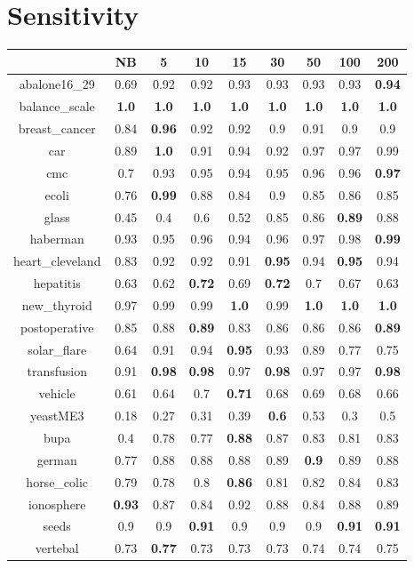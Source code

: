 \documentclass{article}%
\begin{document}
%
\section*{Sensitivity}%
\begin{tabular}{c|cccccccc}%
\hline%
&NB&5&10&15&30&50&100&200\\%
\hline%
abalone16\_29&0.69&0.92&0.92&0.93&0.93&0.93&0.93&\textbf{0.94}\\%
\hline%
balance\_scale&\textbf{1.0}&\textbf{1.0}&\textbf{1.0}&\textbf{1.0}&\textbf{1.0}&\textbf{1.0}&\textbf{1.0}&\textbf{1.0}\\%
\hline%
breast\_cancer&0.84&\textbf{0.96}&0.92&0.92&0.9&0.91&0.9&0.9\\%
\hline%
car&0.89&\textbf{1.0}&0.91&0.94&0.92&0.97&0.97&0.99\\%
\hline%
cmc&0.7&0.93&0.95&0.94&0.95&0.96&0.96&\textbf{0.97}\\%
\hline%
ecoli&0.76&\textbf{0.99}&0.88&0.84&0.9&0.85&0.86&0.85\\%
\hline%
glass&0.45&0.4&0.6&0.52&0.85&0.86&\textbf{0.89}&0.88\\%
\hline%
haberman&0.93&0.95&0.96&0.94&0.96&0.97&0.98&\textbf{0.99}\\%
\hline%
heart\_cleveland&0.83&0.92&0.92&0.91&\textbf{0.95}&0.94&\textbf{0.95}&0.94\\%
\hline%
hepatitis&0.63&0.62&\textbf{0.72}&0.69&\textbf{0.72}&0.7&0.67&0.63\\%
\hline%
new\_thyroid&0.97&0.99&0.99&\textbf{1.0}&0.99&\textbf{1.0}&\textbf{1.0}&\textbf{1.0}\\%
\hline%
postoperative&0.85&0.88&\textbf{0.89}&0.83&0.86&0.86&0.86&\textbf{0.89}\\%
\hline%
solar\_flare&0.64&0.91&0.94&\textbf{0.95}&0.93&0.89&0.77&0.75\\%
\hline%
transfusion&0.91&\textbf{0.98}&\textbf{0.98}&0.97&\textbf{0.98}&0.97&0.97&\textbf{0.98}\\%
\hline%
vehicle&0.61&0.64&0.7&\textbf{0.71}&0.68&0.69&0.68&0.66\\%
\hline%
yeastME3&0.18&0.27&0.31&0.39&\textbf{0.6}&0.53&0.3&0.5\\%
\hline%
bupa&0.4&0.78&0.77&\textbf{0.88}&0.87&0.83&0.81&0.83\\%
\hline%
german&0.77&0.88&0.88&0.88&0.89&\textbf{0.9}&0.89&0.88\\%
\hline%
horse\_colic&0.79&0.78&0.8&\textbf{0.86}&0.81&0.82&0.84&0.83\\%
\hline%
ionosphere&\textbf{0.93}&0.87&0.84&0.92&0.88&0.84&0.88&0.89\\%
\hline%
seeds&0.9&0.9&\textbf{0.91}&0.9&0.9&0.9&\textbf{0.91}&\textbf{0.91}\\%
\hline%
vertebal&0.73&\textbf{0.77}&0.73&0.73&0.73&0.74&0.74&0.75\\%
\hline%
\end{tabular}
\end{document}
